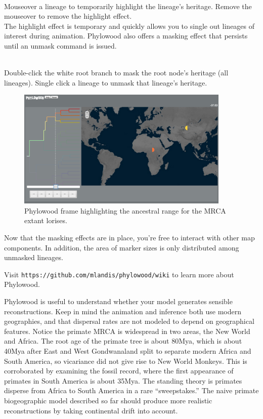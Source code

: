 \noindent \\ \impmark Mouseover a lineage to temporarily highlight the lineage's heritage. Remove the mouseover to remove the highlight effect. \\

The highlight effect is temporary and quickly allows you to single out lineages of interest during animation.
Phylowood also offers a masking effect that persists until an unmask command is issued.

\noindent \\ \impmark Double-click the white root branch to mask the root node's heritage (all lineages). Single click a lineage to unmask that lineage's heritage. \\

\begin{figure}[H]
\centering
\includegraphics[width=4in]{figures/bg_1_loris}
\caption{Phylowood frame highlighting the ancestral range for the MRCA extant lorises.}
\end{figure}

Now that the masking effects are in place, you're free to interact with other map components.
In addition, the area of marker sizes is only distributed among unmasked lineages.

Visit \texttt{https://github.com/mlandis/phylowood/wiki} to learn more about Phylowood.

Phylowood is useful to understand whether your model generates sensible reconstructions.
Keep in mind the animation and inference both use modern geographies, and that dispersal rates are not modeled to depend on geographical features.
Notice the primate MRCA is widespread in two areas, the New World and Africa.
The root age of the primate tree is about 80Mya, which is about 40Mya after East and West Gondwanaland split to separate modern Africa and South America, so vicariance did not give rise to New World Monkeys.
This is corroborated by examining the fossil record, where the first appearance of primates in South America is about 35Mya.
The standing theory is primates disperse from Africa to South America in a rare ``sweepstakes.''
The naive primate biogeographic model described so far should produce more realistic reconstructions by taking continental drift into account.

